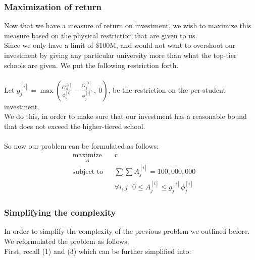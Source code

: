 \documentclass[12pt]{scrartcl}
\begin{document}
	\subsubsection{Maximization of return}
		Now that we have a measure of return on investment, we wish to maximize this measure based on the physical restriction that are given to us.\\
		Since we only have a limit of \$$100$M, and would not want to overshoot our investment by giving any particular university more than what the top-tier schools are given. We put the following restriction forth.\\
		\\
		Let $g_j^{[i]} = \max( \frac{  G_o^{[i]}  }{  \phi_o^{[i]} } - \frac{  G_j^{[i]}  }{  \phi_j^{[i]} } \ ,\ 0 )$, be the restriction on the per-student investment.\\ 
		We do this, in order to make sure that our investment has a reasonable bound that does not exceed the higher-tiered school.\\
		\\
		So now our problem can be formulated as follows:
		\begin{equation*}
				\begin{aligned}
					& \underset{A}{\text{maximize}}
					& &\bar{r}\\
					& \text{subject to}
					& & \sum \sum A_j^{[i]} = 100,000,000 \\
					&&& \forall i,j \ \ \ 0\le A_j^{[i]} \le g_j^{[i]}\phi_j^{[i]}
				\end{aligned}
		\end{equation*}

	\subsubsection{Simplifying the complexity}
		In order to simplify the complexity of the previous problem we outlined before. We reformulated the problem as follows:\\
		First, recall (1) and (3) which can be further simplified into:
		
\end{document}
